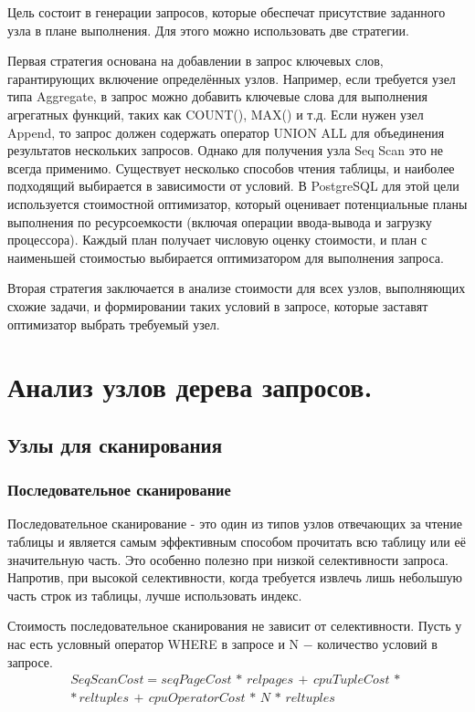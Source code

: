 Цель состоит в генерации запросов, которые обеспечат присутствие заданного узла в плане выполнения. Для этого можно использовать две стратегии.

Первая стратегия основана на добавлении в запрос ключевых слов, гарантирующих включение определённых узлов. Например, если требуется узел типа Aggregate, в запрос можно добавить ключевые слова для выполнения агрегатных функций, таких как COUNT(), MAX() и т.д. Если нужен узел Append, то запрос должен содержать оператор UNION ALL для объединения результатов нескольких запросов. Однако для получения узла Seq Scan это не всегда применимо. Существует несколько способов чтения таблицы, и наиболее подходящий выбирается в зависимости от условий. В PostgreSQL для этой цели используется стоимостной оптимизатор, который оценивает потенциальные планы выполнения по ресурсоемкости (включая операции ввода-вывода и загрузку процессора). Каждый план получает числовую оценку стоимости, и план с наименьшей стоимостью выбирается оптимизатором для выполнения запроса.

Вторая стратегия заключается в анализе стоимости для всех узлов, выполняющих схожие задачи, и формировании таких условий в запросе, которые заставят оптимизатор выбрать требуемый узел.

\section{Анализ узлов дерева запросов.}

\subsection{Узлы для сканирования}

\subsubsection{Последовательное сканирование}

Последовательное сканирование - это один из типов узлов отвечающих за чтение таблицы и является самым эффективным способом прочитать всю таблицу или её значительную часть. Это особенно полезно при низкой селективности запроса. Напротив, при высокой селективности, когда требуется извлечь лишь небольшую часть строк из таблицы, лучше использовать индекс.

Стоимость последовательное сканирования не зависит от селективности. Пусть у нас есть условный оператор WHERE в запросе и N $-$ количество условий в запросе.
\begin{equation}
\begin{array}{c}
SeqScanCost =  seqPageCost \, *  \,  relpages  \,  + \,  cpuTupleCost  \,  *  \, \\
* \, reltuples  \,  +  \, cpuOperatorCost  \, * \,  N  \, * \,  reltuples
\label{seq_scan_cost}
\end{array}
\end{equation}

